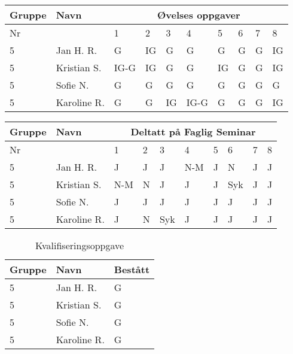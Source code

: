 \documentclass[12pt, a4paper, skip = 10pt plus1pt, indent = 40pt, 
textwidth = 12cm]{report}
\begin{document}
		\begin{tabular}{ |p{2cm}|p{2.8cm}||p{1cm}|p{1cm}|p{1cm}|p{1cm}|p{1cm}|p{1cm}|p{1cm}|p{1cm}| }
		\hline
		Gruppe & Navn & \multicolumn{8}{|c|}{Øvelses oppgaver} \\
		\hline
		Nr &  & 1 & 2 & 3 & 4 & 5 & 6 & 7 & 8 \\
		\hline
		5 & Jan H. R. & G & IG & G & G & G & G & G & IG\\
		\hline
		5 & Kristian S. & IG-G & IG & G & G & IG & G & G & IG\\
		\hline
		5 & Sofie N. & G & G & G & G & G & G & G & G\\
		\hline
		5 & Karoline R. & G & G & IG & IG-G & G & G & G & IG\\
		\hline 
\end{tabular}

\begin{tabular}{ |p{2cm}|p{2.8cm}||p{1cm}|p{1cm}|p{1cm}|p{1cm}|p{1cm}|p{1cm}|p{1cm}|p{1cm}| }
	\hline
	Gruppe & Navn & \multicolumn{8}{|c|}{Deltatt på Faglig Seminar} \\
	\hline
	Nr &  & 1 & 2 & 3 & 4 & 5 & 6 & 7 & 8 \\
	\hline
	5 & Jan H. R. & J & J & J & N-M & J & N & J & J\\
	\hline
	5 & Kristian S. & N-M & N & J & J & J & Syk & J & J\\
	\hline
	5 & Sofie N. & J & J & J & J & J & J & J & J\\
	\hline
	5 & Karoline R. & J & N & Syk & J & J & J & J & J\\
	\hline 
\end{tabular}

\begin{table}
	\caption{Kvalifiseringsoppgave}
	\begin{tabular}{
			|p{2cm}|p{2.8cm}||p{2.5cm}| }
		\hline
		Gruppe & Navn & Bestått \\
		\hline
		5 & Jan H. R. & G \\
		\hline
		5 & Kristian S. & G \\
		\hline
		5 & Sofie N. & G \\
		\hline
		5 & Karoline R. & G \\
		\hline
	\end{tabular}
\end{table}
\end{document}
